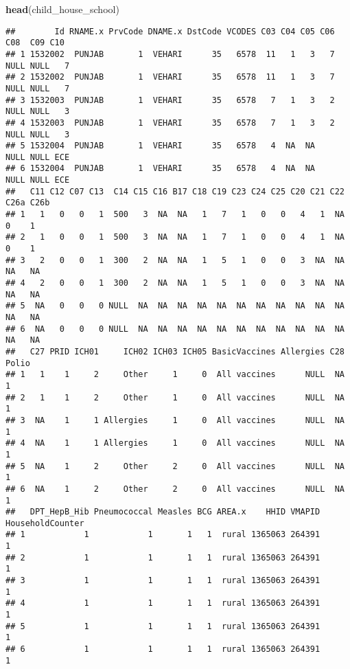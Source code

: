 \documentclass[
]{article}
\newenvironment{Shaded}{\begin{snugshade}}{\end{snugshade}}
\newcommand{\FunctionTok}[1]{\textcolor[rgb]{0.13,0.29,0.53}{\textbf{#1}}}
\newcommand{\NormalTok}[1]{#1}
\begin{document}
\begin{Shaded}
\begin{Highlighting}[]
\FunctionTok{head}\NormalTok{(child\_house\_school)}
\end{Highlighting}
\end{Shaded}

\begin{verbatim}
##        Id RNAME.x PrvCode DNAME.x DstCode VCODES C03 C04 C05 C06  C08  C09 C10
## 1 1532002  PUNJAB       1  VEHARI      35   6578  11   1   3   7 NULL NULL   7
## 2 1532002  PUNJAB       1  VEHARI      35   6578  11   1   3   7 NULL NULL   7
## 3 1532003  PUNJAB       1  VEHARI      35   6578   7   1   3   2 NULL NULL   3
## 4 1532003  PUNJAB       1  VEHARI      35   6578   7   1   3   2 NULL NULL   3
## 5 1532004  PUNJAB       1  VEHARI      35   6578   4  NA  NA     NULL NULL ECE
## 6 1532004  PUNJAB       1  VEHARI      35   6578   4  NA  NA     NULL NULL ECE
##   C11 C12 C07 C13  C14 C15 C16 B17 C18 C19 C23 C24 C25 C20 C21 C22 C26a C26b
## 1   1   0   0   1  500   3  NA  NA   1   7   1   0   0   4   1  NA    0    1
## 2   1   0   0   1  500   3  NA  NA   1   7   1   0   0   4   1  NA    0    1
## 3   2   0   0   1  300   2  NA  NA   1   5   1   0   0   3  NA  NA   NA   NA
## 4   2   0   0   1  300   2  NA  NA   1   5   1   0   0   3  NA  NA   NA   NA
## 5  NA   0   0   0 NULL  NA  NA  NA  NA  NA  NA  NA  NA  NA  NA  NA   NA   NA
## 6  NA   0   0   0 NULL  NA  NA  NA  NA  NA  NA  NA  NA  NA  NA  NA   NA   NA
##   C27 PRID ICH01     ICH02 ICH03 ICH05 BasicVaccines Allergies C28 Polio
## 1   1    1     2     Other     1     0  All vaccines      NULL  NA     1
## 2   1    1     2     Other     1     0  All vaccines      NULL  NA     1
## 3  NA    1     1 Allergies     1     0  All vaccines      NULL  NA     1
## 4  NA    1     1 Allergies     1     0  All vaccines      NULL  NA     1
## 5  NA    1     2     Other     2     0  All vaccines      NULL  NA     1
## 6  NA    1     2     Other     2     0  All vaccines      NULL  NA     1
##   DPT_HepB_Hib Pneumococcal Measles BCG AREA.x    HHID VMAPID HouseholdCounter
## 1            1            1       1   1  rural 1365063 264391                1
## 2            1            1       1   1  rural 1365063 264391                1
## 3            1            1       1   1  rural 1365063 264391                1
## 4            1            1       1   1  rural 1365063 264391                1
## 5            1            1       1   1  rural 1365063 264391                1
## 6            1            1       1   1  rural 1365063 264391                1

\end{verbatim}
\end{document}
